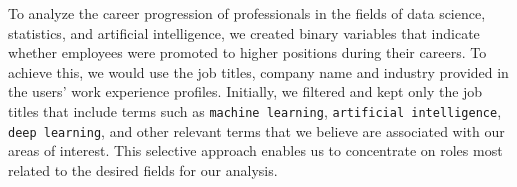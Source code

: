 \documentclass[11pt,]{article}
\newenvironment{Shaded}{\begin{snugshade}}{\end{snugshade}}
\newcommand{\AttributeTok}[1]{\textcolor[rgb]{0.13,0.29,0.53}{#1}}
\newcommand{\FunctionTok}[1]{\textcolor[rgb]{0.13,0.29,0.53}{\textbf{#1}}}
\newcommand{\NormalTok}[1]{#1}
\newcommand{\OtherTok}[1]{\textcolor[rgb]{0.56,0.35,0.01}{#1}}
\newcommand{\SpecialCharTok}[1]{\textcolor[rgb]{0.81,0.36,0.00}{\textbf{#1}}}
\newcommand{\StringTok}[1]{\textcolor[rgb]{0.31,0.60,0.02}{#1}}
\begin{document}
To analyze the career progression of professionals in the fields of data
science, statistics, and artificial intelligence, we created binary
variables that indicate whether employees were promoted to higher
positions during their careers. To achieve this, we would use the job
titles, company name and industry provided in the users' work experience
profiles. Initially, we filtered and kept only the job titles that
include terms such as \texttt{machine\ learning},
\texttt{artificial\ intelligence}, \texttt{deep\ learning}, and other
relevant terms that we believe are associated with our areas of
interest. This selective approach enables us to concentrate on roles
most related to the desired fields for our analysis.

\begin{Shaded}
\end{Shaded}
\end{document}
